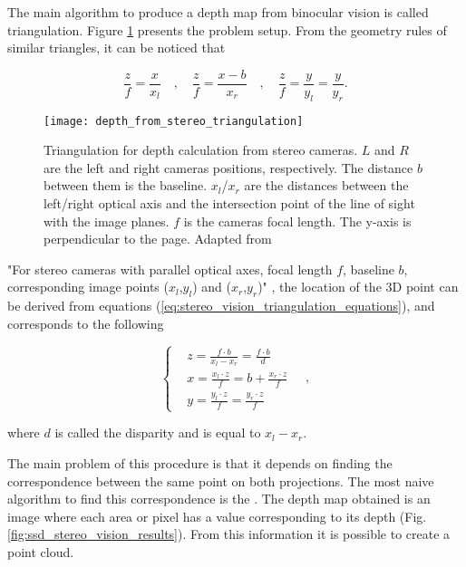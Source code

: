 The main algorithm to produce a depth map from binocular vision is called triangulation. Figure \ref{fig:depth_from_stereo_triangulation} presents the problem setup. From the geometry rules of similar triangles, it can be noticed that

\begin{equation}
    \label{eq:stereo_vision_triangulation_equations}
    \frac{z}{f} = \frac{x}{x_l} \quad,\quad \frac{z}{f} = \frac{x-b}{x_r} \quad,\quad \frac{z}{f} = \frac{y}{y_l} = \frac{y}{y_r}.
\end{equation}

\begin{figure}[htbp]
	\centering
	\texttt{[image: depth\_from\_stereo\_triangulation]}
	\caption[Triangulation for depth calculation from stereo cameras.]{Triangulation for depth calculation from stereo cameras. $L$ and $R$ are the left and right cameras positions, respectively. The distance $b$ between them is the baseline. $x_l$/$x_r$ are the distances between the left/right optical axis and the intersection point of the line of sight with the image planes. $f$ is the cameras focal length. The y-axis is perpendicular to the page. Adapted from \cite{Rao2009_stereo_3d_vision}}
	\label{fig:depth_from_stereo_triangulation}
\end{figure}

"For stereo cameras with parallel optical axes, focal length $f$, baseline $b$, corresponding image points ($x_l$,$y_l$) and ($x_r$,$y_r$)" \cite{Rao2009_stereo_3d_vision}, the location of the 3D point can be derived from equations (\ref{eq:stereo_vision_triangulation_equations}), and corresponds to the following

\begin{equation}
    \left\{
    \begin{aligned}
    & z = \frac{f \cdot b}{x_l - x_r} = \frac{f \cdot b}{d} \\
    & x = \frac{x_l \cdot z}{f} = b + \frac{x_r \cdot z}{f} \\
    & y = \frac{y_l \cdot z}{f} = \frac{y_r \cdot z}{f}
    \end{aligned}
    \right.
    \quad,
\end{equation}

where $d$ is called the disparity and is equal to $x_l - x_r$.

The main problem of this procedure is that it depends on finding the correspondence between the same point on both projections. The most naive algorithm to find this correspondence is the . The depth map obtained is an image where each area or pixel has a value corresponding to its depth (Fig. \ref{fig:ssd_stereo_vision_results}). From this information it is possible to create a point cloud.


